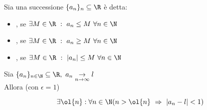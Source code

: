\documentclass[../appunti.tex]{subfiles}
\begin{document}


\begin{eser}



\end{eser}





\begin{defn}
Sia una successione $ \{ a_n \}_n \subseteq \R $ è detta:

\begin{itemize}
	\item {}, se 
		$ \exists M \in \R\ :\ a_n \leq M\ \forall n \in \N $
	\item {}, se
		$ \exists M \in \R\ :\ a_n \geq M\ \forall n \in \N $
	\item {}, se 
		$ \exists M \in \R\ :\ | a_n | \leq M\ \forall n \in \N $ 
\end{itemize}
\end{defn}

\begin{defn}
Sia $\{ a_n \}_{n \in \N} \subseteq \R,\ a_n \underset{n \to \infty}{\to} l$ \\
Allora (con $\epsilon = 1$) 

\begin{equation}
	\exists \ol{n}: \forall n \in \N
        ( n > \ol{n}\ \Rightarrow\ | a_n - l | < 1 )
\end{equation}
\end{defn}
\end{document}
